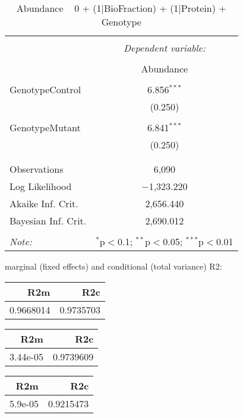 \documentclass[11pt]{report}
\begin{document}
\begin{table}[!htbp] \centering 
  \caption{Abundance ~ 0 + (1|BioFraction) + (1|Protein) + Genotype} 
  \label{} 
\begin{tabular}{@{\extracolsep{5pt}}lc} 
\\[-1.8ex]\hline 
\hline \\[-1.8ex] 
 & \multicolumn{1}{c}{\textit{Dependent variable:}} \\ 
\cline{2-2} 
\\[-1.8ex] & Abundance \\ 
\hline \\[-1.8ex] 
 GenotypeControl & 6.856$^{***}$ \\ 
  & (0.250) \\ 
  & \\ 
 GenotypeMutant & 6.841$^{***}$ \\ 
  & (0.250) \\ 
  & \\ 
\hline \\[-1.8ex] 
Observations & 6,090 \\ 
Log Likelihood & $-$1,323.220 \\ 
Akaike Inf. Crit. & 2,656.440 \\ 
Bayesian Inf. Crit. & 2,690.012 \\ 
\hline 
\hline \\[-1.8ex] 
\textit{Note:}  & \multicolumn{1}{r}{$^{*}$p$<$0.1; $^{**}$p$<$0.05; $^{***}$p$<$0.01} \\ 
\end{tabular} 
\end{table} 
marginal (fixed effects) and conditional (total variance) R2:

\begin{tabular}{r|r}
\hline
R2m & R2c\\
\hline
0.9668014 & 0.9735703\\
\hline
\end{tabular}

\begin{tabular}{r|r}
\hline
R2m & R2c\\
\hline
3.44e-05 & 0.9739609\\
\hline
\end{tabular}

\begin{tabular}{r|r}
\hline
R2m & R2c\\
\hline
5.9e-05 & 0.9215473\\
\hline
\end{tabular}
\end{document}
